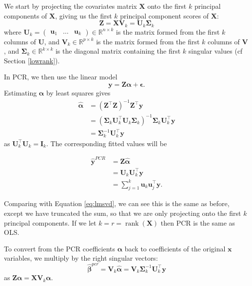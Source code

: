 \documentclass[
]{book}
\theoremstyle{definition}
\theoremstyle{definition}
\theoremstyle{definition}
\theoremstyle{definition}
\theoremstyle{remark}
\begin{document}
We start by projecting the covariates matrix \(\mathbf X\) onto the first \(k\) principal components of \(\mathbf X\), giving us the first \(k\) principal component scores of \(\mathbf X\):
\[\mathbf Z= \mathbf X\mathbf V_k= \mathbf U_k \boldsymbol{\Sigma}_k\]
where \(\mathbf U_k=\begin{pmatrix}\mathbf u_1&\ldots & \mathbf u_k\end{pmatrix} \in \mathbb{R}^{n \times k}\) is the matrix formed from the first \(k\) columns of \(\mathbf U\), and \(\mathbf V_k\in \mathbb{R}^{p \times k}\) is the matrix formed from the first \(k\) columns of \(\mathbf V\), and \(\boldsymbol{\Sigma}_k\in \mathbb{R}^{k \times k}\) is the diagonal matrix containing the first \(k\) singular values (cf Section \ref{lowrank}).

In PCR, we then use the linear model
\[\mathbf y= \mathbf Z\boldsymbol \alpha+\boldsymbol \epsilon.\]
Estimating \(\boldsymbol \alpha\) by least squares gives
\begin{align*}
\hat{\boldsymbol \alpha} &= (\mathbf Z^\top \mathbf Z)^{-1}\mathbf Z^\top \mathbf y\\
&= (\boldsymbol{\Sigma}_k \mathbf U_k^\top \mathbf U_k\boldsymbol{\Sigma}_k)^{-1}\boldsymbol{\Sigma}_k \mathbf U_k^\top \mathbf y\\
&=\boldsymbol{\Sigma}_k^{-1}\mathbf U_k^\top \mathbf y
\end{align*}
as \(\mathbf U_k^\top\mathbf U_k =\mathbf I_k\). The corresponding fitted values will be

\begin{align}
\hat{\mathbf y}^{PCR} &= \mathbf Z\hat{\boldsymbol \alpha} \\
&= \mathbf U_k \mathbf U_k^\top \mathbf y\\
&=\sum_{j=1}^k \mathbf u_k \mathbf u_j^\top \mathbf y.
\end{align}

Comparing with Equation \eqref{eq:lmsvd}, we can see this is the same as before, except we have truncated the sum, so that we are only projecting onto the first \(k\) principal components. If we let \(k=r = \operatorname{rank}(\mathbf X)\) then PCR is the same as OLS.

To convert from the PCR coefficients \(\boldsymbol \alpha\) back to coefficients of the original \(\mathbf x\) variables, we multiply by the right singular vectors:
\[\hat{\boldsymbol \beta}^{pcr} = \mathbf V_k \hat{\boldsymbol \alpha} = \mathbf V_k \boldsymbol{\Sigma}_k^{-1} \mathbf U_k^\top \mathbf y\]
as \(\mathbf Z\boldsymbol \alpha= \mathbf X\mathbf V_k \boldsymbol \alpha\).
\end{document}

